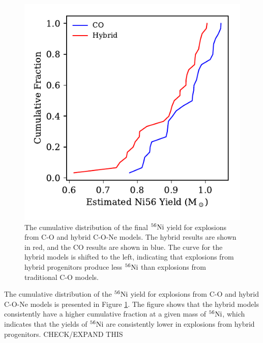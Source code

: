 \documentclass[iop,apj]{emulateapj}
\newcommand{\Ni}[1]{\ensuremath{{}^{#1}{\rm Ni}}}
\begin{document}
\begin{figure}
\includegraphics[width=\columnwidth]{figures/ni56_yield_cum_dist.pdf}
\caption{\label{fig:cumdist}
The cumulative distribution of the final \Ni{56} yield for explosions from
C-O and hybrid C-O-Ne models. The hybrid results are shown in red, and the CO
results are shown in blue. The curve for the hybrid models is shifted
to the left, indicating that explosions from hybrid progenitors produce
less \Ni{56} than explosions from traditional C-O models.
}
\end{figure}
The cumulative distribution of the \Ni{56} yield for explosions from
C-O and hybrid C-O-Ne models is presented in Figure \ref{fig:cumdist}.
The figure shows that the hybrid models consistently have a higher
cumulative fraction at a given mass of \Ni{56}, which indicates
that the yields of \Ni{56} are consistently lower in explosions
from hybrid progenitors. {\color{red} CHECK/EXPAND THIS}
\end{document}
